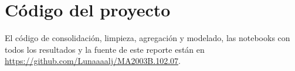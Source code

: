 \section*{Código del proyecto}
\label{sec:codigo}

El código de consolidación, limpieza, agregación y modelado, las notebooks
con todos los resultados y la fuente de este reporte están en
\url{https://github.com/Lunaaaalj/MA2003B.102.07}.
